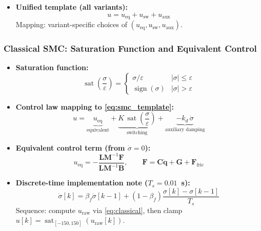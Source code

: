 \documentclass[10pt, a4paper]{article}
\newcommand{\vq}{\boldsymbol{q}}
\newcommand{\sign}{\operatorname{sign}}
\newcommand{\sat}{\operatorname{sat}}
\begin{document}
\begin{itemize}[leftmargin=1.5em,itemsep=0.2em]
  \item \textbf{Unified template (all variants):}
  \begin{equation}
    u = u_\text{eq} + u_\text{sw} + u_\text{aux}
    \label{eq:smc_template}
  \end{equation}
  Mapping: variant-specific choices of $(u_\text{eq},u_\text{sw},u_\text{aux})$.
\end{itemize}

\subsubsection{Classical SMC: Saturation Function and Equivalent Control}

\begin{itemize}[leftmargin=1.5em,itemsep=0.2em]
  \item \textbf{Saturation function:}
  \begin{equation}
    \sat\!\left(\frac{\sigma}{\varepsilon}\right) =
    \begin{cases}
      \sigma/\varepsilon & |\sigma| \leq \varepsilon \\
      \sign(\sigma)      & |\sigma| > \varepsilon
    \end{cases}
    \label{eq:sat}
  \end{equation}

  \item \textbf{Control law mapping to \eqref{eq:smc_template}:}
  \begin{equation}
    u = \underbrace{u_\text{eq}}_{\text{equivalent}}
      + \underbrace{K\,\sat\!\left(\frac{\sigma}{\varepsilon}\right)}_{\text{switching}}
      + \underbrace{-k_d\,\dot{\sigma}}_{\text{auxiliary damping}}
    \label{eq:classical}
  \end{equation}

  \item \textbf{Equivalent control term (from $\dot{\sigma}=0$):}
  \begin{equation}
    u_\text{eq} = -\frac{\mathbf{L}\mathbf{M}^{-1}\mathbf{F}}
                       {\mathbf{L}\mathbf{M}^{-1}\mathbf{B}},
    \qquad \mathbf{F}=\mathbf{C}\dot{\vq}+\mathbf{G}+\mathbf{F}_\text{fric}
    \label{eq:ueq}
  \end{equation}

  \item \textbf{Discrete-time implementation note ($T_s=0.01$~s):}
  \begin{equation}
    \dot{\sigma}[k] = \beta_f\dot{\sigma}[k-1]
    + (1-\beta_f)\frac{\sigma[k]-\sigma[k-1]}{T_s}
  \end{equation}
  Sequence: compute $u_\text{raw}$ via \eqref{eq:classical}, then clamp
  $u[k]=\sat_{[-150,150]}(u_\text{raw}[k])$.
\end{itemize}
\end{document}
